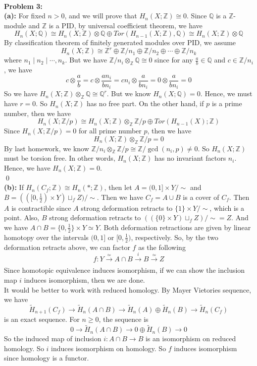 \documentclass[12pt]{amsart}
\newcommand{\Q}{\mathbb{Q}}
\newcommand{\Z}{\mathbb{Z}}
\begin{document}
\\
\textbf{Problem 3:}\\
\textbf{(a):} For fixed $n>0$, and we will prove that $H_n(X;\Z)\cong 0$. Since $\Q$ is a $\Z$-module and $\Z$ is a PID, by universal coefficient theorem, we have 
\[H_n(X;\Q)\cong H_n(X;\Z)\otimes \Q\oplus Tor(H_{n-1}(X;\Z),\Q)\cong H_n(X;\Z)\otimes \Q \]
By classification   theorem of finitely generated modules over PID, we assume 
\[H_n(X;\Z)\cong \Z^r\oplus \Z/n_1\oplus \Z/n_2\oplus \cdots\oplus \Z/n_k\]
where $n_1\mid n_2\mid \cdots, n_k$. But we have $\Z/n_i\otimes_\Z \Q\cong 0$ since for any $\frac{a}{b}\in \Q$ and $c\in\Z/n_i$, we have 
\[c\otimes \frac{a}{b}=c\otimes \frac{an_i}{bn_i}=cn_i\otimes \frac{a}{bn_i}=0\otimes\frac{a}{bn_i}=0\]
So we have $H_n(X;\Z)\otimes_\Z \Q\cong \Q^r$.
But we know $H_n(X;\Q)=0$. Hence, we must have $r=0$. So $H_n(X;\Z)$ has no free part.
On the other hand, if $p$ is a prime number, then we have 
\[H_n(X;\Z/p)\cong H_n(X;\Z)\otimes_\Z \Z/p\oplus Tor(H_{n-1}(X);\Z)\]
Since $H_n(X;\Z/p)=0$ for all prime number $p$, then we have 
\[H_n(X;\Z)\otimes_\Z \Z/p=0 \]
By last homework, we know $\Z/n_i\otimes_\Z \Z/p\cong \Z/\gcd(n_i,p)\neq 0$. So $H_n(X;\Z)$ must be torsion free. In other words, $H_n(X;\Z)$ has no invariant factors $n_i$. Hence, we have $H_n(X;\Z)=0$.
\\\qed\\
\textbf{(b):} If $H_n(C_f;\Z)\cong H_n(\ast;\Z)$, then let $A=(0,1]\times Y/\sim$ and $B=(([0,\frac{1}{2})\times Y)\sqcup_f Z)/\sim$. Then we have $C_f=A\cup B$ is a cover of $C_f$. Then $A$ is contractible since $A$ strong deformation retracts to $\{1\}\times Y/\sim$, which is a point. Also, $B$ strong deformation retracts to $((\{0\}\times Y)\sqcup_f Z)/\sim=Z$. And we have $A\cap B=\{0,\frac{1}{2}\}\times Y\simeq Y$. Both deformation retractions are given by linear homotopy over the intervals $(0,1]$ or $[0,\frac{1}{2})$, respectively. So, by the two deformation retracts above, we can factor $f$ as the following  
\[f:Y\xrightarrow[]{\simeq}A\cap B\xrightarrow[]{i}B\xrightarrow[]{\simeq }Z\]
Since homotopic equivalence induces isomorphism, if we can show the inclusion map $i$ induces isomorphism, then we are done.
\\
It would be better to work with reduced homology. By Mayer Vietories sequence, we have 
\[\tilde{H}_{n+1}(C_f)\to \tilde{H}_n(A\cap B)\to \tilde{H}_n(A)\oplus \tilde{H}_n(B)\to \tilde{H}_n(C_f)\]
is an exact sequence. For $n\geq 0$, the sequence is 
\[0\to \tilde{H}_n(A\cap B)\to 0\oplus \tilde{H}_n(B)\to 0 \]
So the induced map of inclusion $i:A\cap B\to B$ is an isomorphism on reduced homology. So $i$ induces isomorphism on homology. So $f$ induces isomorphism since homology is a functor.\\
\end{document}
